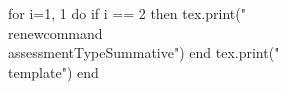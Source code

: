 \documentclass[twoside, 10pt]{article}
\title{}
\date{}
\newcommand{\assessmentType}{Formative}
\newcommand{\template}{
\directlua{tex.print(utils.genVersion())}
\noindent
{\large
First Name \rule{8em}{.4pt}\hspace{\stretch{1}} Last Name \rule{8em}{.4pt}\hspace{\stretch{1}} Date \rule{1.5em}{.4pt} -- \rule{1.5em}{.4pt} -- \rule{1.5em}{.4pt}\hspace{\stretch{1}} Period \rule{2em}{.4pt}\hspace{\stretch{1}}
}
\vspace{1em}

\noindent
\renewcommand{\arraystretch}{2}
\begin{tabular}{|l|l|l|}
\hline
\textbf{ARGUE}&\textbf{MODEL}&\textbf{BE PRECISE}\\
\hline
&&\\
\hline
\end{tabular}

\vspace{1em}
\noindent
\textbf{Tools:} calculator, ruler, protractor 
\vspace{1em}

\noindent
\textbf{Example}. Let $\displaystyle v = \frac{\sqrt2}{2} + \frac{\sqrt2}{2}i$. The measure of the angle between the positive real axis and the ray from the origin to $v$ is $45^\circ$ and the distance from the origin to $v$ is $1$. See the figure below.

\begin{center}
\begin{tikzpicture}
\begin{axis}[
xlabel={$Re$},
ylabel={$Im$},
axis lines=middle,
ymin=-3.5, ymax=3.5,
xmin=-3.5, xmax=3.5,
yticklabel={$\pgfmathprintnumber{\tick}i$},
width=7in,
height=7in,
grid = both,
xtick distance = 1,
ytick distance = 1,
minor y tick num = 4,
minor x tick num = 4,
grid style={draw=gray!80, dashed}
]
\draw[fill=black] (0.707,0.707) circle (2pt);
\draw[fill=black] (0.707,0.907) node{\Large $v$} ;
\draw[thick] (0,0) -- (0.707,0.707);
\draw[thick] (0,0) -- (1,0);
\draw (0.5, 0.2) node{\large $45^\circ$};
\draw (0.25, 0.4) node{\large $1$};
\end{axis}
\end{tikzpicture}
\end{center}
Here the unit of length is $1$ inch. You are encouraged to remeasure the distance and the angle with the hand tools as practice for using the tools.
\clearpage
\begin{enumerate}
\item (\textbf{Be Precise}) Let $\displaystyle w = \frac{\sqrt 3}{2} + \frac{1}{2}i$. Plot $w$ in the complex plan below, and measure the angle between the positive real axis and the ray from the origin to $w$ and the distance from the origin to $w$. Label the measure of the angle and the distance on the graph.
\begin{center}
\begin{tikzpicture}
\begin{axis}[
xlabel={$Re$},
ylabel={$Im$},
axis lines=middle,
ymin=-3.5, ymax=3.5,
xmin=-3.5, xmax=3.5,
yticklabel={$\pgfmathprintnumber{\tick}i$},
width=7in,
height=7in,
grid = both,
xtick distance = 1,
ytick distance = 1,
minor y tick num = 4,
minor x tick num = 4,
grid style={draw=gray!80, dashed}
]
\end{axis}
\end{tikzpicture}
\end{center}
\item (\textbf{Argue}) Let $z = 1 + 2i$. Calculate $z \cdot w$. Show your work.
\clearpage
\item (\textbf{Be Precise}) Plot $z$ and $z\cdot w$ in the complex plan below, and measure the angle between the ray from the origin to $z$ and the ray from the origin to $z\cdot w$. Label the measure of the angle on the graph.
\begin{center}
\begin{tikzpicture}
\begin{axis}[
xlabel={$Re$},
ylabel={$Im$},
axis lines=middle,
ymin=-3.5, ymax=3.5,
xmin=-3.5, xmax=3.5,
yticklabel={$\pgfmathprintnumber{\tick}i$},
width=7in,
height=7in,
grid = both,
xtick distance = 1,
ytick distance = 1,
minor y tick num = 4,
minor x tick num = 4,
grid style={draw=gray!80, dashed}
]
\end{axis}
\end{tikzpicture}
\end{center}
\vspace{\stretch{1}}
\item\label{hypothesis} (\textbf{Model}) Examining the first graph and second graph, how would you describe what multiplying by $w$ does to $z$?

Hint: Complete the following sentence. Multiplying $z$ by $w$ will rotate $z$ about the origin counterclockwise by\\[1em] \rule{6em}{0.4pt} degrees, which is precisely the measure of the angle between $w$ and the positive $x$-axis.
\clearpage
\item\label{plan}  (\textbf{Model}) You want to test the model you came up with in Problem \ref{hypothesis} with a few more experiments. Let $z_1 = -1 + i$, $z_2= -1 + 0.6i$ and $z_3 = 1 - 1.8i$. Explain how you will use these numbers as test materials, then demonstrate your results in the plot below.

\textbf{Explanation:}
\vspace{\stretch{1}}

\textbf{Results:}
\begin{center}
\begin{tikzpicture}
\begin{axis}[
xlabel={$Re$},
ylabel={$Im$},
axis lines=middle,
ymin=-3.5, ymax=3.5,
xmin=-3.5, xmax=3.5,
yticklabel={$\pgfmathprintnumber{\tick}i$},
width=7in,
height=7in,
grid = both,
xtick distance = 1,
ytick distance = 1,
minor y tick num = 4,
minor x tick num = 4,
grid style={draw=gray!80, dashed}
]
\end{axis}
\end{tikzpicture}
\end{center}
\item (\textbf{Argue}) Based on the model you found, explain what multiplying $w^3$ to a complex number $z$ does to $z$, and how you know it.
\vspace{\stretch{1}}
\end{enumerate}
\clearpage
}
\begin{document}
\begin{luacode*}
for i=1, 1 do
	if i == 2 then
		tex.print("\\renewcommand{\\assessmentType}{Summative}")
	end
	tex.print("\\template")
end
\end{luacode*}
\end{document}
